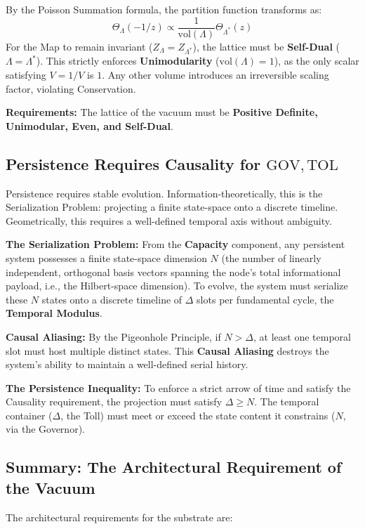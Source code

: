 By the Poisson Summation formula, the partition function transforms as:
\begin{equation}
    \Theta_\Lambda(-1/z) \propto \frac{1}{\text{vol}(\Lambda)} \Theta_{\Lambda^*}(z)
\end{equation}
For the Map to remain invariant ($Z_{\Lambda} = Z_{\Lambda^*}$), the lattice must be \textbf{Self-Dual} ($\Lambda = \Lambda^*$). This strictly enforces \textbf{Unimodularity} ($\text{vol}(\Lambda) = 1$), as the only scalar satisfying $V = 1/V$ is $1$. Any other volume introduces an irreversible scaling factor, violating Conservation.

\textbf{Requirements:} The lattice of the vacuum must be \textbf{Positive Definite, Unimodular, Even, and Self-Dual}.

\subsection{Persistence Requires Causality for \texorpdfstring{$\mathrm{GOV}, \mathrm{TOL}$}{GOV, TOL}}
\label{sec:causality}
Persistence requires stable evolution. Information-theoretically, this is the Serialization Problem: projecting a finite state-space onto a discrete timeline. Geometrically, this requires a well-defined temporal axis without ambiguity.

\textbf{The Serialization Problem:} From the \textbf{Capacity} component, any persistent system possesses a finite state-space dimension $N$ (the number of linearly independent, orthogonal basis vectors spanning the node's total informational payload, i.e., the Hilbert-space dimension). To evolve, the system must serialize these $N$ states onto a discrete timeline of $\Delta$ slots per fundamental cycle, the \textbf{Temporal Modulus}.

\textbf{Causal Aliasing:} By the Pigeonhole Principle, if $N > \Delta$, at least one temporal slot must host multiple distinct states. This \textbf{Causal Aliasing} destroys the system's ability to maintain a well-defined serial history.
    
\textbf{The Persistence Inequality:} To enforce a strict arrow of time and satisfy the Causality requirement, the projection must satisfy $\Delta \ge N$. The temporal container ($\Delta$, the Toll) must meet or exceed the state content it constrains ($N$, via the Governor).

\subsection{Summary: The Architectural Requirement of the Vacuum}
The architectural requirements for the substrate are:

